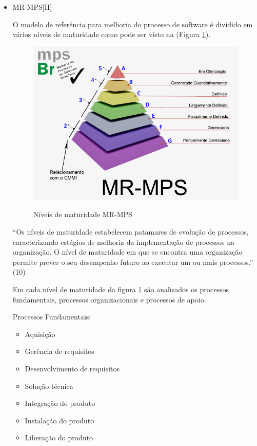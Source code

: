 \begin{itemize}

\item MR-MPS[H]

O modelo de referência para melhoria do processo de software é dividido em vários níveis de maturidade como pode ser visto na (Figura \ref{img:MR-MPS2}).

\begin{figure}
		\centering
		\caption{Níveis de maturidade MR-MPS}
		\includegraphics[width=\textwidth]{figuras/MR-MPS2}
		\label{img:MR-MPS2}
\end{figure}

“Os níveis de maturidade estabelecem patamares de evolução de processos, caracterizando estágios de melhoria da implementação de processos na organização. O nível de maturidade em que se encontra uma organização permite prever o seu desempenho futuro ao executar um ou mais processos.” (10)

Em cada nível de maturidade da figura \ref{img:MR-MPS2}  são analisados os processos fundamentais, processos organizacionais e processos de apoio.

Processos Fundamentais:

\begin{itemize}
\item Aquisição
\item Gerência de requisitos
\item Desenvolvimento de requisitos
\item Solução técnica
\item Integração do produto
\item Instalação do produto
\item Liberação do produto
\end{itemize}


\end{itemize}
